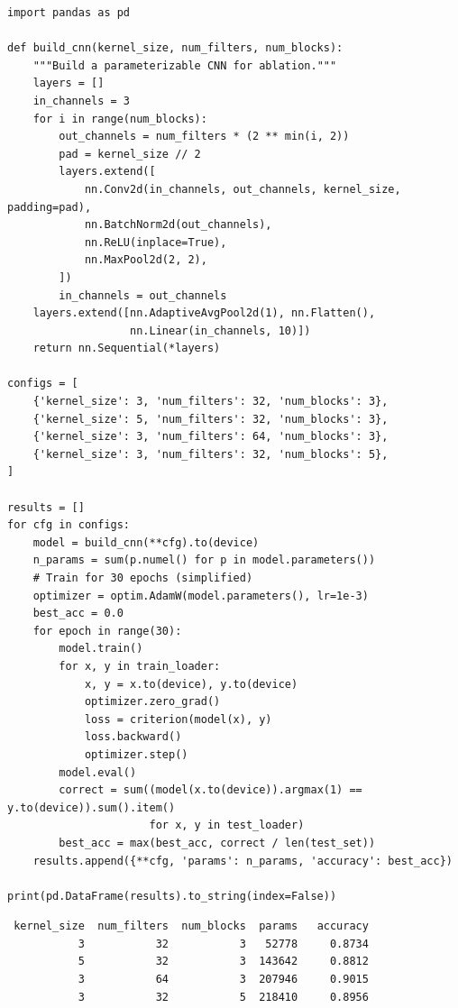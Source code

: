 \begin{codeblock}[title=\textbf{Ablation: kernel size, number of filters, depth}]
\begin{verbatim}
import pandas as pd

def build_cnn(kernel_size, num_filters, num_blocks):
    """Build a parameterizable CNN for ablation."""
    layers = []
    in_channels = 3
    for i in range(num_blocks):
        out_channels = num_filters * (2 ** min(i, 2))
        pad = kernel_size // 2
        layers.extend([
            nn.Conv2d(in_channels, out_channels, kernel_size, padding=pad),
            nn.BatchNorm2d(out_channels),
            nn.ReLU(inplace=True),
            nn.MaxPool2d(2, 2),
        ])
        in_channels = out_channels
    layers.extend([nn.AdaptiveAvgPool2d(1), nn.Flatten(),
                   nn.Linear(in_channels, 10)])
    return nn.Sequential(*layers)

configs = [
    {'kernel_size': 3, 'num_filters': 32, 'num_blocks': 3},
    {'kernel_size': 5, 'num_filters': 32, 'num_blocks': 3},
    {'kernel_size': 3, 'num_filters': 64, 'num_blocks': 3},
    {'kernel_size': 3, 'num_filters': 32, 'num_blocks': 5},
]

results = []
for cfg in configs:
    model = build_cnn(**cfg).to(device)
    n_params = sum(p.numel() for p in model.parameters())
    # Train for 30 epochs (simplified)
    optimizer = optim.AdamW(model.parameters(), lr=1e-3)
    best_acc = 0.0
    for epoch in range(30):
        model.train()
        for x, y in train_loader:
            x, y = x.to(device), y.to(device)
            optimizer.zero_grad()
            loss = criterion(model(x), y)
            loss.backward()
            optimizer.step()
        model.eval()
        correct = sum((model(x.to(device)).argmax(1) == y.to(device)).sum().item()
                      for x, y in test_loader)
        best_acc = max(best_acc, correct / len(test_set))
    results.append({**cfg, 'params': n_params, 'accuracy': best_acc})

print(pd.DataFrame(results).to_string(index=False))
\end{verbatim}
\end{codeblock}

\begin{codeoutput}
\begin{verbatim}
 kernel_size  num_filters  num_blocks  params   accuracy
           3           32           3   52778     0.8734
           5           32           3  143642     0.8812
           3           64           3  207946     0.9015
           3           32           5  218410     0.8956
\end{verbatim}
\end{codeoutput}

